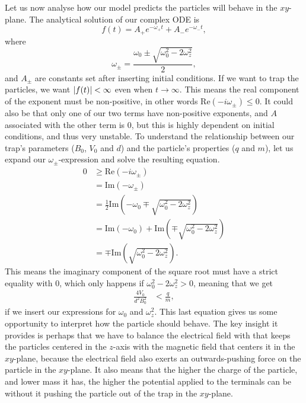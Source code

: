 Let us now analyse how our model predicts the particles will behave in the $xy$-plane. The analytical solution of our complex ODE is 
%
\begin{equation}
f(t) = A_+e^{-\omega_+ t} + A_-e^{-\omega_- t},
\label{eq:analytical_solution_xy}
\end{equation}
%
where
\begin{equation*}
\omega_\pm = \frac{\omega_0 \pm \sqrt{\omega_0^2 - 2 \omega_z^2}}{2},
\end{equation*}
and $A_\pm$ are constants set after inserting initial conditions.
%
If we want to trap the particles, we want $\abs{f(t)} < \infty$ even when $t \to \infty$. This means the real component of the exponent must be non-positive, in other words $\text{Re}(-i\omega_\pm) \leq 0$. It could also be that only one of our two terms have non-positive exponents, and $A$ associated with the other term is $0$, but this is highly dependent on initial conditions, and thus very unstable. To understand the relationship between our trap's parameters ($B_0$, $V_0$ and $d$) and the particle's properties ($q$ and $m$), let us expand our $\omega_\pm$-expression and solve the resulting equation.
%
\begin{align*}
0 &\geq \text{Re} \left(-i \omega_\pm \right) \\
  &= \text{Im} \left(- \omega_\pm \right) \\
  &= \frac{1}{2} \text{Im} \left(- \omega_0 \mp \sqrt{\omega_0^2 - 2 \omega_z^2} \right) \\
  &= \text{Im} \left(- \omega_0 \right) + \text{Im} \left( \mp \sqrt{\omega_0^2 - 2 \omega_z^2} \right) \\
  &= \mp \text{Im} \left( \sqrt{\omega_0^2 - 2 \omega_z^2} \right).
\end{align*}
%
This means the imaginary component of the square root must have a strict equality with $0$, which only happens if $\omega_0^2 - 2 \omega_z^2 > 0$, meaning that we get
%
\begin{align*}
\frac{4V_0}{d^2 B_0^2} &< \frac{q}{m},
\end{align*}
%
if we insert our expressions for $\omega_0$ and $\omega_z^2$. This last equation gives us some opportunity to interpret how the particle should behave. The key insight it provides is perhaps that we have to balance the electrical field with that keeps the particles centered in the $z$-axis with the magnetic field that centers it in the $xy$-plane, because the electrical field also exerts an outwards-pushing force on the particle in the $xy$-plane. It also means that the higher the charge of the particle, and lower mass it has, the higher the potential applied to the terminals can be without it pushing the particle out of the trap in the $xy$-plane.

